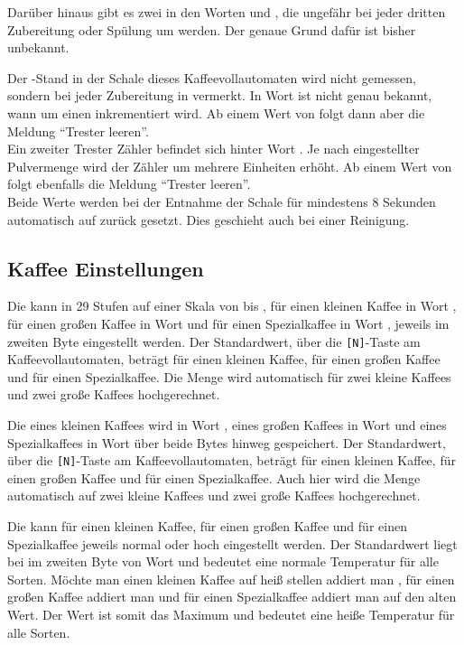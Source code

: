 Darüber hinaus gibt es zwei  in den Worten  und , die ungefähr bei jeder dritten Zubereitung oder Spülung um  werden.
Der genaue Grund dafür ist bisher unbekannt.

Der -Stand in der Schale dieses Kaffeevollautomaten wird nicht gemessen, sondern bei jeder Zubereitung in  vermerkt.
In Wort  ist nicht genau bekannt, wann um einen inkrementiert wird.
Ab einem Wert von  folgt dann aber die Meldung "`Trester leeren"'.\\
Ein zweiter Trester Zähler befindet sich hinter Wort .
Je nach eingestellter Pulvermenge wird der Zähler um mehrere Einheiten erhöht.
Ab einem Wert von  folgt ebenfalls die Meldung "`Trester leeren"'.\\
Beide Werte werden bei der Entnahme der Schale für mindestens 8 Sekunden automatisch auf  zurück gesetzt.
Dies geschieht auch bei einer Reinigung.

\subsection{Kaffee Einstellungen}
Die  kann in 29 Stufen auf einer Skala von  bis , für einen kleinen Kaffee in Wort , für einen großen Kaffee in Wort  und für einen Spezialkaffee in Wort , jeweils im zweiten Byte eingestellt werden.
Der Standardwert, über die \texttt{[N]}-Taste am Kaffeevollautomaten, beträgt  für einen kleinen Kaffee,  für einen großen Kaffee und  für einen Spezialkaffee.
Die Menge wird automatisch für zwei kleine Kaffees und zwei große Kaffees hochgerechnet.

Die  eines kleinen Kaffees wird in Wort , eines großen Kaffees in Wort  und eines Spezialkaffees in Wort  über beide Bytes hinweg gespeichert.
Der Standardwert, über die \texttt{[N]}-Taste am Kaffeevollautomaten, beträgt  für einen kleinen Kaffee,  für einen großen Kaffee und  für einen Spezialkaffee.
Auch hier wird die Menge automatisch auf zwei kleine Kaffees und zwei große Kaffees hochgerechnet.

Die  kann für einen kleinen Kaffee, für einen großen Kaffee und für einen Spezialkaffee jeweils normal oder hoch eingestellt werden.
Der Standardwert liegt bei  im zweiten Byte von Wort  und bedeutet eine normale Temperatur für alle Sorten.
Möchte man einen kleinen Kaffee auf heiß stellen addiert man , für einen großen Kaffee addiert man  und für einen Spezialkaffee addiert man  auf den alten Wert.
Der Wert  ist somit das Maximum und bedeutet eine heiße Temperatur für alle Sorten.

